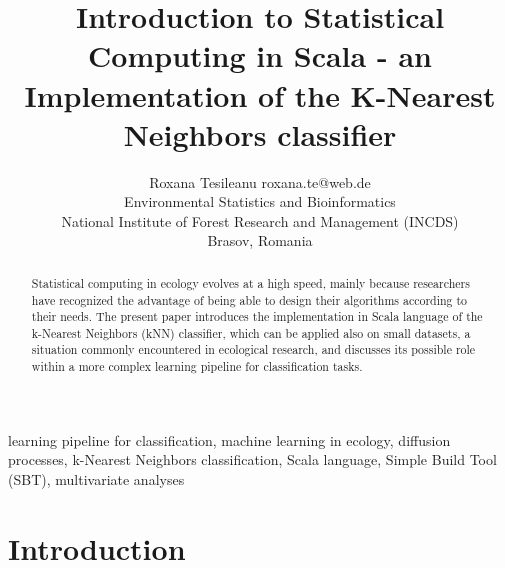 \documentclass[twoside, 11p]{article}
\begin{document}
\title{Introduction to Statistical Computing in Scala - an Implementation of the K-Nearest Neighbors classifier}

\author{\name Roxana Tesileanu \email roxana.te@web.de \\
	\addr Environmental Statistics and Bioinformatics \\
	National Institute of Forest Research and Management (INCDS)\\
	Brasov, Romania} 

\maketitle

\begin{abstract}%
 Statistical computing in ecology evolves at a high speed, mainly because researchers have recognized the advantage of being able to design their algorithms according to their needs.
 The present paper introduces the implementation in Scala language of the k-Nearest Neighbors (kNN) classifier, which can be applied also on small datasets, a situation commonly encountered in ecological research, and discusses its possible role within a more complex learning pipeline for classification tasks. 
\end{abstract}

\begin{keywords}
learning pipeline for classification, machine learning in ecology, diffusion processes,  k-Nearest Neighbors classification, Scala language, Simple Build Tool (SBT), multivariate analyses 
\end{keywords}

\section{Introduction}
   
\end{document}
